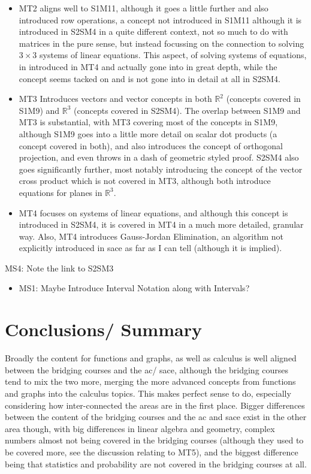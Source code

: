\documentclass[twoside,12pt,a4paper]{report}
\begin{document}
\begin{itemize}
\begin{itemize}
			\item MT2 aligns well to S1M11, although it goes a little further and also introduced row operations, a concept not introduced in S1M11 although it is introduced in S2SM4 in a quite different context, not so much to do with matrices in the pure sense, but instead focussing on the connection to solving $3 \times 3$ systems of linear equations. This aspect, of solving systems of equations, in introduced in MT4 and actually gone into in great depth, while the concept seems tacked on and is not gone into in detail at all in S2SM4.
			\item MT3 Introduces vectors and vector concepts in both $\mathbb{R}^2$ (concepts covered in S1M9) and $\mathbb{R}^3$ (concepts covered in S2SM4). The overlap between S1M9 and MT3 is substantial, with MT3 covering most of the concepts in S1M9, although S1M9 goes into a little more detail on scalar dot products (a concept covered in both), and also introduces the concept of orthogonal projection, and even throws in a dash of geometric styled proof. S2SM4 also goes significantly further, most notably introducing the concept of the vector cross product which is not covered in MT3, although both introduce equations for planes in $\mathbb{R}^3$.
			\item MT4 focuses on systems of linear equations, and although this concept is introduced in S2SM4, it is covered in MT4 in a much more detailed, granular way. Also, MT4 introduces Gauss-Jordan Elimination, an algorithm not explicitly introduced in \gls{sace} as far as I can tell (although it is implied).
		\end{itemize}
\end{itemize}


MS4: Note the link to S2SM3 

\begin{itemize}
	\item MS1: Maybe Introduce Interval Notation along with Intervals?
\end{itemize}






\section{Conclusions/ Summary}

Broadly the content for functions and graphs, as well as calculus is well aligned between the bridging courses and the \gls{ac}/ \gls{sace}, although the bridging courses tend to mix the two more, merging the more advanced concepts from functions and graphs into the calculus topics. This makes perfect sense to do, especially considering how inter-connected the areas are in the first place. Bigger differences between the content of the bridging courses and the \gls{ac} and \gls{sace} exist in the other area though, with big differences in linear algebra and geometry, complex numbers almost not being covered in the bridging courses (although they used to be covered more, see the discussion relating to MT5), and the biggest difference being that statistics and probability are not covered in the bridging courses at all.
\end{document}
